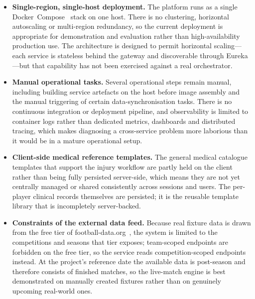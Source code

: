 \begin{itemize}
  \item \textbf{Single-region, single-host deployment.} The platform runs as a single
        Docker~Compose~\cite{docker} stack on one host. There is no clustering,
        horizontal autoscaling or multi-region redundancy, so the current deployment is
        appropriate for demonstration and evaluation rather than high-availability
        production use. The architecture is designed to permit horizontal scaling---each
        service is stateless behind the gateway and discoverable through Eureka---but that
        capability has not been exercised against a real orchestrator.

  \item \textbf{Manual operational tasks.} Several operational steps remain manual,
        including building service artefacts on the host before image assembly and the
        manual triggering of certain data-synchronisation tasks. There is no continuous
        integration or deployment pipeline, and observability is limited to container
        logs rather than dedicated metrics, dashboards and distributed tracing, which makes
        diagnosing a cross-service problem more laborious than it would be in a mature
        operational setup.

  \item \textbf{Client-side medical reference templates.} The general medical
        catalogue templates that support the injury workflow are partly held on the client
        rather than being fully persisted server-side, which means they are not yet
        centrally managed or shared consistently across sessions and users. The per-player
        clinical records themselves are persisted; it is the reusable template library that
        is incompletely server-backed.

  \item \textbf{Constraints of the external data feed.} Because real fixture data is
        drawn from the free tier of football-data.org~\cite{footballdata}, the system
        is limited to the competitions and seasons that tier exposes; team-scoped endpoints
        are forbidden on the free tier, so the service reads competition-scoped endpoints
        instead. At the project's reference date the available data is post-season and
        therefore consists of finished matches, so the live-match engine is best
        demonstrated on manually created fixtures rather than on genuinely upcoming
        real-world ones.


\end{itemize}
